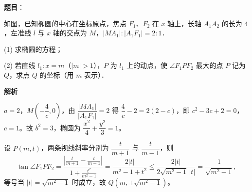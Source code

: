 \begin{answer}

\textbf{题目}：

如图，已知椭圆的中心在坐标原点，焦点 $F_1$、$F_2$ 在 $x$ 轴上，长轴 $A_1A_2$ 的长为 $4$，左准线 $l$ 与 $x$ 轴的交点为 $M$，$|MA_1| : |A_1F_1| = 2:1$．

(1) 求椭圆的方程；

(2) 若直线 $l_1: x = m$（$|m| > 1$），$P$ 为 $l_1$ 上的动点，使 $\angle F_1PF_2$ 最大的点 $P$ 记为 $Q$，求点 $Q$ 的坐标（用 $m$ 表示）．
\nopagebreak[4]
\begin{center}\end{center}
\nopagebreak[4]
\textbf{解析}


$a = 2$，$M\left(-\dfrac{4}{c}, 0\right)$，由 $\dfrac{|MA_1|}{|A_1F_1|} = 2$ 得 $\dfrac{4}{c} - 2 = 2(2 - c)$，即 $c^2 - 3c + 2 = 0$，$c = 1$。故 $b^2 = 3$，椭圆为 $\dfrac{x^2}{4} + \dfrac{y^2}{3} = 1$。


设 $P(m, t)$，两条视线斜率分别为 $\dfrac{t}{m + 1}$ 与 $\dfrac{t}{m - 1}$，则
\nopagebreak[4]
\[
\tan\angle F_1PF_2 = \frac{\left|\frac{t}{m + 1} - \frac{t}{m - 1}\right|}{1 + \frac{t^2}{m^2 - 1}} = \frac{2|t|}{m^2 - 1 + t^2} \leqslant \frac{2|t|}{2\sqrt{m^2 - 1}\,|t|} = \frac{1}{\sqrt{m^2 - 1}},
\]
等号当 $|t| = \sqrt{m^2 - 1}$ 时成立，故 $Q\left(m, \pm\sqrt{m^2 - 1}\right)$。



\end{answer}
